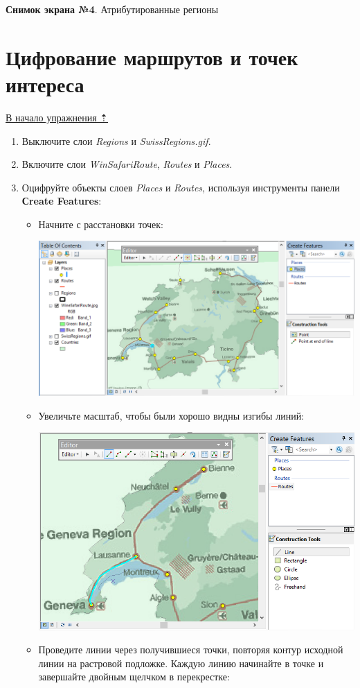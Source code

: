 \documentclass[12pt,]{book}
\begin{document}
\textbf{Снимок экрана №4}. Атрибутированные регионы

\hypertarget{map-ref-general-routes-poi}{%
\section{Цифрование маршрутов и точек интереса}\label{map-ref-general-routes-poi}}

\protect\hyperlink{map-ref-general}{В начало упражнения ⇡}

\begin{enumerate}
\def\labelenumi{\arabic{enumi}.}
\item
  Выключите слои \emph{Regions} и \emph{SwissRegions.gif}.
\item
  Включите слои \emph{WinSafariRoute}, \emph{Routes} и \emph{Places}.
\item
  Оцифруйте объекты слоев \emph{Places} и \emph{Routes}, используя инструменты панели \textbf{Сreate Features}:

  \begin{itemize}
  \item
    Начните с расстановки точек:

    \includegraphics{images/Ex05/image25.png}
  \item
    Увеличьте масштаб, чтобы были хорошо видны изгибы линий:

    \includegraphics{images/Ex05/image26.png}
  \item
    Проведите линии через получившиеся точки, повторяя контур исходной линии на растровой подложке. Каждую линию начинайте в точке и завершайте двойным щелчком в перекрестке:


\end{itemize}
\end{enumerate}
\end{document}

